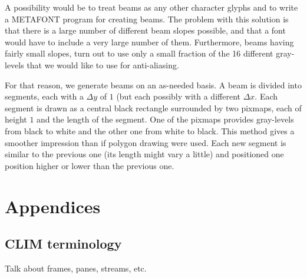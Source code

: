 \documentclass[11pt]{book}
\def\clim{CLIM}
\def\metafont{METAFONT}
\def\inputtex#1{}
\begin{document}
A possibility would be to treat beams as any other character glyphs
and to write a {\metafont} program for creating beams.  The problem
with this solution is that there is a large number of different beam
slopes possible, and that a font would have to include a very large
number of them.  Furthermore, beams having fairly small slopes, turn
out to use only a small fraction of the 16 different gray-levels that
we would like to use for anti-aliasing. 

For that reason, we generate beams on an as-needed basis.  A beam is
divided into segments, each with a $\Delta y$ of $1$ (but each
possibly with a different $\Delta x$.  Each segment is drawn as a
central black rectangle surrounded by two pixmaps, each of height $1$
and the length of the segment.  One of the pixmaps provides
gray-levels from black to white and the other one from white to
black.  This method gives a smoother impression than if polygon
drawing were used.  Each new segment is similar to the previous one
(its length might vary a little) and positioned one position higher or
lower than the previous one.

\part{Appendices}
\appendix

\inputtex{history.tex}
\inputtex{beaming-algo.tex}
\inputtex{accidentals.tex}
\inputtex{release-notes.tex}
\inputtex{plans.tex}

\chapter{{\clim} terminology}
\label{clim-terminology}

Talk about frames, panes, streams, etc.

\nocite{ross-1987} \nocite{haken-1993} \nocite{haken-1995}
\nocite{aho-hopcroft-ullman} \nocite{blostein-1991}
\nocite{blostein-1994} \nocite{gourlay-1987-spacing}
\nocite{gourlay-1987-formatting} \nocite{hegazy-1987}
\nocite{hegazy-1987-breaking} \nocite{rader-1996} \nocite{tex}


\printindex

\newpage


\end{document}
